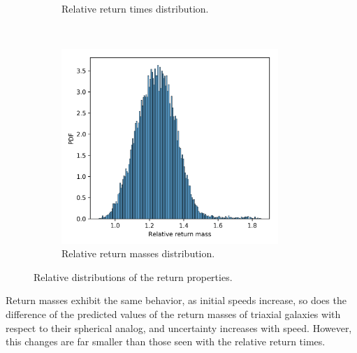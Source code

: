 \begin{figure}[h!]
\begin{subfigure}[b]{0.49\textwidth}
			\caption{Relative return times distribution.}
			\label{fig: relTimeDist}
		\end{subfigure}
		~ 
		\begin{subfigure}[b]{0.49\textwidth}
			\includegraphics[width = 0.9\textwidth]{"../Files/Week 14/relative_mass_dist"}
			\caption{Relative return masses distribution.}
			\label{fig: relMassDist}
		\end{subfigure}
		\caption{Relative distributions of the return properties.}
		\label{fig: relatives}
	\end{figure}

	Return masses exhibit the same behavior, as initial speeds increase, so does the difference of the predicted values of the return masses of triaxial galaxies with respect to their spherical analog, and uncertainty increases with speed. However, this changes are far smaller than those seen with the relative return times.
	
